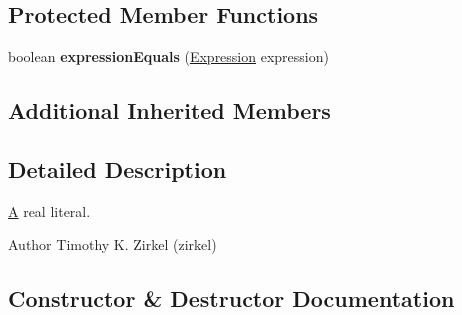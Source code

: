 \subsection*{Protected Member Functions}
\begin{DoxyCompactItemize}
\item 
\hypertarget{classedu_1_1udel_1_1cis_1_1vsl_1_1civl_1_1model_1_1common_1_1expression_1_1CommonRealLiteralExpression_a6da656bfc3c8cf9c1c6bb2a3abe9211a}{}boolean {\bfseries expression\+Equals} (\hyperlink{interfaceedu_1_1udel_1_1cis_1_1vsl_1_1civl_1_1model_1_1IF_1_1expression_1_1Expression}{Expression} expression)\label{classedu_1_1udel_1_1cis_1_1vsl_1_1civl_1_1model_1_1common_1_1expression_1_1CommonRealLiteralExpression_a6da656bfc3c8cf9c1c6bb2a3abe9211a}

\end{DoxyCompactItemize}
\subsection*{Additional Inherited Members}


\subsection{Detailed Description}
\hyperlink{structA}{A} real literal. 

\begin{DoxyAuthor}{Author}
Timothy K. Zirkel (zirkel) 
\end{DoxyAuthor}


\subsection{Constructor \& Destructor Documentation}
\hypertarget{classedu_1_1udel_1_1cis_1_1vsl_1_1civl_1_1model_1_1common_1_1expression_1_1CommonRealLiteralExpression_a7c7e8ab7168a95237fb2448870243eaf}{}
